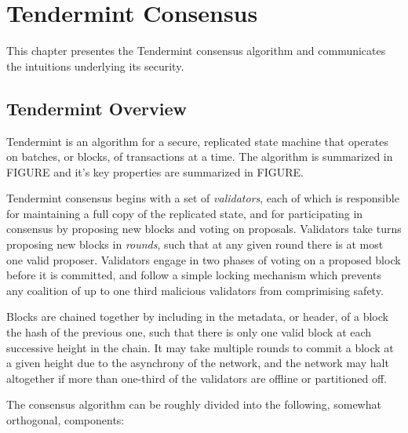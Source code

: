 \chapter{Tendermint Consensus}

This chapter presentes the Tendermint consensus algorithm and communicates the intuitions underlying its security.

\section{Tendermint Overview}

Tendermint is an algorithm for a secure, replicated state machine that operates on batches, or blocks, of transactions at a time.
The algorithm is summarized in FIGURE and it's key properties are summarized in FIGURE. 

Tendermint consensus begins with a set of \emph{validators}, each of which is responsible for maintaining a full copy of the replicated state,
and for participating in consensus by proposing new blocks and voting on proposals.
Validators take turns proposing new blocks in \emph{rounds}, such that at any given round there is at most one valid proposer.
Validators engage in two phases of voting on a proposed block before it is committed, 
and follow a simple locking mechanism which prevents any coalition of up to one third malicious validators from comprimising safety.

Blocks are chained together by including in the metadata, or header, of a block the hash of the previous one,
such that there is only one valid block at each successive height in the chain.
It may take multiple rounds to commit a block at a given height due to the asynchrony of the network,
and the network may halt altogether if more than one-third of the validators are offline or partitioned off.

The consensus algorithm can be roughly divided into the following, somewhat orthogonal, components:

